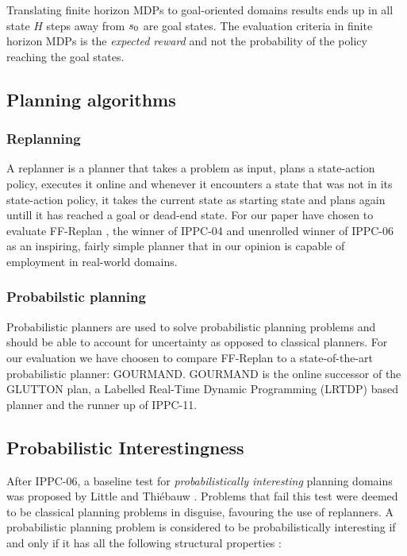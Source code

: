\documentclass[runningheads,a4paper]{llncs}
\begin{document}
Translating finite horizon MDPs to goal-oriented domains results ends up in all state $H$ steps away from $s\textsubscript{0}$ are goal states. The evaluation criteria in finite horizon MDPs is the \emph{expected reward} and not the probability of the policy reaching the goal states.

\subsection{Planning algorithms}
\subsubsection{Replanning}
A replanner is a planner that takes a problem as input, plans a state-action policy, executes it online and whenever it encounters a state that was not in its state-action policy, it takes the current state as starting state and plans again untill it has reached a goal or dead-end state. For our paper have chosen to evaluate FF-Replan \cite{FFReplan}, the winner of IPPC-04 and unenrolled winner of IPPC-06 as an inspiring, fairly simple planner that in our opinion is capable of employment in real-world domains. 

\subsubsection{Probabilstic planning}
Probabilistic planners are used to solve probabilistic planning problems and should be able to account for uncertainty as opposed to classical planners. For our evaluation we have choosen to compare FF-Replan to a state-of-the-art probabilistic planner: GOURMAND. GOURMAND is the online successor of the GLUTTON plan, a Labelled Real-Time Dynamic Programming (LRTDP) based planner and the runner up of IPPC-11.

\subsection{Probabilistic Interestingness}
After IPPC-06, a baseline test for \emph{probabilistically interesting} planning domains was proposed by Little and Thi\'ebauw \cite{little2007probvsreplan}.  Problems that fail this test were deemed to be classical planning problems in disguise, favouring the use of replanners. A probabilistic planning problem is considered to be probabilistically interesting if and only if it has all the following structural properties \cite{little2007probvsreplan}:
\end{document}
